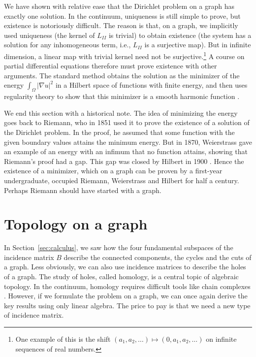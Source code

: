 \documentclass[11pt,a4paper]{article}
\theoremstyle{plain}
\theoremstyle{definition}
\begin{document}
We have shown with relative ease that the Dirichlet problem on a graph has exactly one solution. In the continuum, uniqueness is still simple to prove, but existence is notoriously difficult. The reason is that, on a graph, we implicitly used uniqueness (the kernel of $L_{II}$ is trivial) to obtain existence (the system has a solution for any inhomogeneous term, i.e., $L_{II}$ is a surjective map). But in infinite dimension, a linear map with trivial kernel need not be surjective.\footnote{One example of this is the shift $(a_1,a_2,\dots)\mapsto(0,a_1,a_2,\dots)$ on infinite sequences of real numbers.} A course on partial differential equations therefore must prove existence with other arguments. The standard method obtains the solution as the minimizer of the energy $\int_\Omega|\nabla u|^2$ in a Hilbert space of functions with finite energy, and then uses regularity theory to show that this minimizer is a smooth harmonic function \cite{evans2010}.

We end this section with a historical note. The idea of minimizing the energy goes back to Riemann, who in 1851 used it to prove the existence of a solution of the Dirichlet problem. In the proof, he assumed that some function with the given boundary values attains the minimum energy. But in 1870, Weierstrass gave an example of an energy with an infimum that no function attains, showing that Riemann's proof had a gap. This gap was closed by Hilbert in 1900 \cite{monna1975}. Hence the existence of a minimizer, which on a graph can be proven by a first-year undergraduate, occupied Riemann, Weierstrass and Hilbert for half a century. Perhaps Riemann should have started with a graph.

\section{Topology on a graph}\label{sec:topology}

In Section~\ref{sec:calculus}, we saw how the four fundamental subspaces of the incidence matrix $B$ describe the connected components, the cycles and the cuts of a graph. Less obviously, we can also use incidence matrices to describe the holes of a graph. The study of holes, called homology, is a central topic of algebraic topology. In the continuum, homology requires difficult tools like chain complexes \cite{hatcher2002}. However, if we formulate the problem on a graph, we can once again derive the key results using only linear algebra. The price to pay is that we need a new type of incidence matrix.
\end{document}
